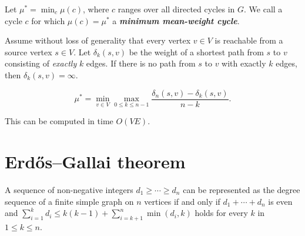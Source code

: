 Let $\mu^\ast = \min_c \mu(c)$, where $c$ ranges over all directed cycles in $G$.
We call a cycle $c$ for which $\mu(c)=\mu^\ast$ a \textbf{\textit{minimum mean-weight cycle}}.

Assume without loss of generality that every vertex $v \in V$ is reachable from a source vertex $s \in V$.
Let $\delta_k (s, v)$ be the weight of a shortest path from $s$ to $v$ consisting of \textit{exactly} $k$ edges.
If there is no path from $s$ to $v$ with exactly $k$ edges, then $\delta_k (s, v) = \infty$.

$$\mu^\ast = \min_{v \in V} \max_{0 \le k \le n - 1}
\frac{\delta_n (s, v) - \delta_k (s, v)}{n - k}.$$

This can be computed in time $O(V E)$.

\section*{Erdős–Gallai theorem}

A sequence of non-negative integers $d_{1} \ge \cdots \ge d_{n}$ can be
represented as the degree sequence of a finite simple graph on $n$ vertices
if and only if $d_{1}+\cdots +d_{n}$ is even and
$\sum _{i=1}^{k}d_{i} \le k(k-1)+\sum _{i=k+1}^{n}\min(d_{i},k)$
holds for every $k$ in $1 \le k \le n$. 
